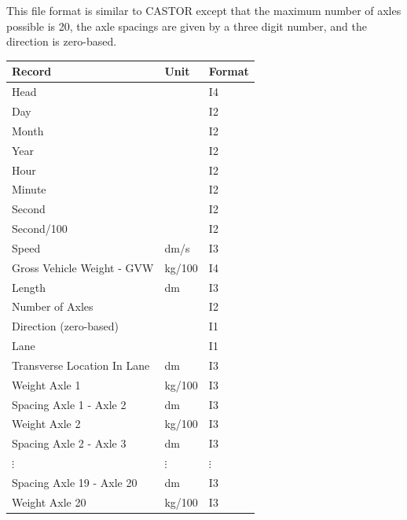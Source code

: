 \documentclass[
]{article}
\begin{document}
This file format is similar to CASTOR except that the maximum number of
axles possible is 20, the axle spacings are given by a three digit
number, and the direction is zero-based.

\begin{longtable}[]{@{}
  >{\raggedright\arraybackslash}p{}
  >{\centering\arraybackslash}p{}
  >{\centering\arraybackslash}p{}@{}}
\toprule\noalign{}
\begin{minipage}[b]{\linewidth}\centering
\textbf{Record}
\end{minipage} & \begin{minipage}[b]{\linewidth}\centering
\textbf{Unit}
\end{minipage} & \begin{minipage}[b]{\linewidth}\centering
\textbf{Format}
\end{minipage} \\
\midrule\noalign{}
\endhead
\bottomrule\noalign{}
\endlastfoot
Head & & I4 \\
Day & & I2 \\
Month & & I2 \\
Year & & I2 \\
Hour & & I2 \\
Minute & & I2 \\
Second & & I2 \\
Second/100 & & I2 \\
Speed & dm/s & I3 \\
Gross Vehicle Weight - GVW & kg/100 & I4 \\
Length & dm & I3 \\
Number of Axles & & I2 \\
Direction (zero-based) & & I1 \\
Lane & & I1 \\
Transverse Location In Lane & dm & I3 \\
Weight Axle 1 & kg/100 & I3 \\
Spacing Axle 1 - Axle 2 & dm & I3 \\
Weight Axle 2 & kg/100 & I3 \\
Spacing Axle 2 - Axle 3 & dm & I3 \\
$\vdots$
&
$\vdots$
&
$\vdots$ \\
Spacing Axle 19 - Axle 20 & dm & I3 \\
Weight Axle 20 & kg/100 & I3 \\
\end{longtable}
\end{document}
